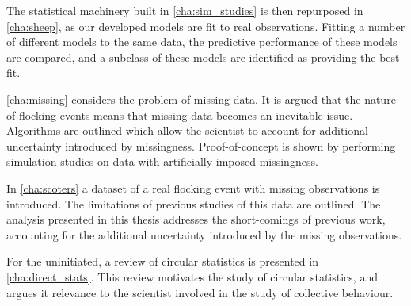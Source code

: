 The statistical machinery built in \cref{cha:sim_studies} is then repurposed in
\cref{cha:sheep}, as our developed models are fit to real observations. Fitting
a number of different models to the same data, the predictive performance of
these models are compared, and a subclass of these models are identified as
providing the best fit.

\cref{cha:missing} considers the problem of missing data. It is argued that the
nature of flocking events means that missing data becomes an inevitable issue.
Algorithms are outlined which allow the scientist to account for additional
uncertainty introduced by missingness. Proof-of-concept is shown by performing
simulation studies on data with artificially imposed missingness.

In \cref{cha:scoters} a dataset of a real flocking event with missing
observations is introduced. The limitations of previous studies of this data
are outlined. The analysis presented in this thesis addresses the short-comings
of previous work, accounting for the additional uncertainty introduced by the
missing observations.

For the uninitiated, a review of circular statistics is presented in
\cref{cha:direct_stats}. This review motivates the study of circular
statistics, and argues it relevance to the scientist involved in the study of
collective behaviour.
